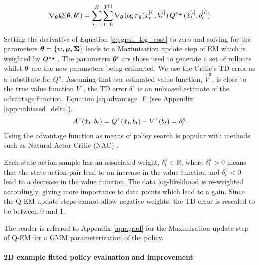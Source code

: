 \begin{equation} \label{eq:grad_log_cost}
  \nabla_{\boldsymbol{\theta}}\mathcal{Q}(\boldsymbol{\theta},\boldsymbol{\theta}') = \sum\limits_{i=1}^{N} \sum\limits_{t=0}^{T^{[i]}} \nabla_{\boldsymbol{\theta}}\log \pi_{\boldsymbol{\theta}}(\dot{x}^{[i]}_t,b^{[i]}_t) \, Q^{\pi_{\boldsymbol{\theta}'}}(\dot{x}^{[i]}_t,b^{[i]}_t)
\end{equation}

Setting the derivative of Equation \ref{eq:grad_log_cost} to zero and solving for the parameters
$\boldsymbol{\theta}=\{w,\boldsymbol{\mu},\boldsymbol{\Sigma}\}$ leads to a Maximisation update step of EM
which is weighted by $Q^{\pi_{\boldsymbol{\theta}'}}$. The parameters $\boldsymbol{\theta}'$ are those used to generate a set of rollouts whilst $\boldsymbol{\theta}$ are the new 
parameters being estimated.
We use the Critic's TD error as a substitute for $Q^{\pi}$. Assuming that our estimated value function, $\hat{V}^{\pi}$, 
is close to the true value function $V^{\pi}$, the TD error $\delta^{\pi}$ is an unbiased estimate of the advantage function, Equation \ref{eq:advantage_f} 
(see Appendix \ref{app:unbiased_delta}).
\begin{equation}\label{eq:advantage_f}
 A^{\pi}(\dot{x}_t,b_t) =  Q^{\pi}(\dot{x}_t,b_t) - V^{\pi}(b_t) = \delta^{\pi}_t
\end{equation}
Using the advantage function as means of policy search is popular with methods such as
Natural Actor Critic (NAC) \cite{peter_nac_2008}.

Each state-action sample has an associated weight, $\delta^{\pi}_t \in \mathbb{R}$, where $\delta^{\pi}_t > 0$ means that the 
state action-pair lead to an increase in the value function and $\delta^{\pi}_t < 0$ lead to 
a decrease in the value function. The data log-likelihood is re-weighted accordingly, giving more importance to data points which lead to a gain. Since 
the Q-EM update steps cannot allow negative weights, the TD error is rescaled to be between 0 and 1. %

The reader is referred to Appendix \ref{app:grad} for the Maximisation update step of Q-EM for a 
GMM parameterization of the policy.

\paragraph{2D example fitted policy evaluation and improvement}\\

